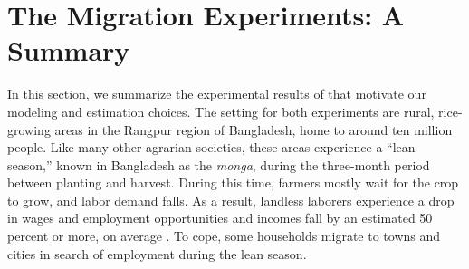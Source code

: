 \documentclass[12pt,pdftex]{article}
\begin{document}
%





%






\section{The Migration Experiments: A Summary}\label{sec:experiment}

In this section, we summarize the experimental results of \citep{brch14, akch17} that motivate our modeling and estimation choices. The setting for both experiments are rural, rice-growing areas in the Rangpur region of Bangladesh, home to around ten million people. Like many other agrarian societies, these areas experience a ``lean season,'' known in Bangladesh as the  \textit{monga}, during the three-month period between planting and harvest. During this time, farmers mostly wait for the crop to grow, and labor demand falls. As a result, landless laborers experience a drop in wages and employment opportunities and incomes fall by an estimated 50 percent or more, on average \citep{khan12}. To cope, some households migrate to towns and cities in search of employment during the lean season.
\end{document}
